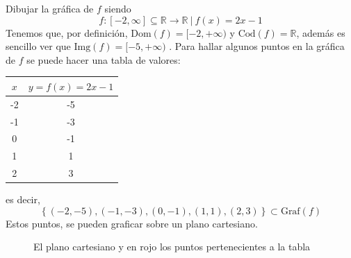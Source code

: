 \begin{example} Dibujar la gr\'afica de $f$ siendo  $$f:  [-2,\infty]  \subseteq \mathbb{R} \rightarrow  \mathbb{R} \:|\:  f(x)=2x-1$$ Tenemos que, por definici\'on,   $\text{Dom}(f)=  [-2,+\infty)$ y   $\text{Cod}(f)=  \mathbb{R}$, adem\'as es sencillo ver que $\text{Img}(f)= [-5,+\infty)$ .
  Para hallar algunos puntos en la gr\'afica de $f$ se puede hacer una tabla de valores:
    \begin{table}[H]
        \centering
        \begin{tabular}{|c|c|}
            \hline
            $x$ & $y=f(x)=2x-1$ \\ \hline
            -2  & -5        \\ \hline
            -1  & -3        \\ \hline
            0   & -1        \\ \hline
            1   & 1        \\ \hline
            2   & 3        \\ \hline
            \end{tabular}
      \end{table} es decir,
       \begin{equation*}
        \left\{(-2,-5), (-1,-3), (0,-1), (1,1),(2,3) \right\}\subset \text{Graf}(f)
    \end{equation*}  Estos puntos, se pueden graficar sobre un plano cartesiano.

\begin{figure}[H] 
       \begin{center}
             \end{center}
             \caption{El plano cartesiano y en rojo los puntos pertenecientes a la tabla}
        \label{fig:unitCircle1} 
   \end{figure}


\end{example}
